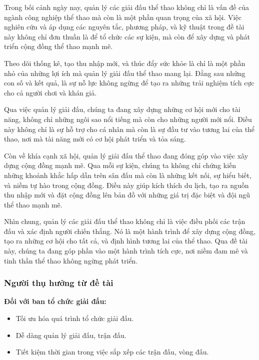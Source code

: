 Trong bối cảnh ngày nay, quản lý các giải đấu thể thao không chỉ là vấn đề của ngành công nghiệp thể thao mà còn là một phần quan trọng của xã hội. Việc nghiên cứu và áp dụng các nguyên tắc, phương pháp, và kỹ thuật trong đề tài này không chỉ đơn thuần là để tổ chức các sự kiện, mà còn để xây dựng và phát triển cộng đồng thể thao mạnh mẽ.
\par
Theo dõi thống kê, tạo thu nhập mới, và thúc đẩy sức khỏe là chỉ là một phần nhỏ của những lợi ích mà quản lý giải đấu thể thao mang lại. Đằng sau những con số và kết quả, là sự nỗ lực không ngừng để tạo ra những trải nghiệm tích cực cho cả người chơi và khán giả.
\par
Qua việc quản lý giải đấu, chúng ta đang xây dựng những cơ hội mới cho tài năng, không chỉ những ngôi sao nổi tiếng mà còn cho những người mới nổi. Điều này không chỉ là sự hỗ trợ cho cá nhân mà còn là sự đầu tư vào tương lai của thể thao, nơi mà tài năng mới có cơ hội phát triển và tỏa sáng.
\par
Còn về khía cạnh xã hội, quản lý giải đấu thể thao đang đóng góp vào việc xây dựng cộng đồng mạnh mẽ. Qua mỗi sự kiện, chúng ta không chỉ chứng kiến những khoảnh khắc hấp dẫn trên sân đấu mà còn là những kết nối, sự hiểu biết, và niềm tự hào trong cộng đồng. Điều này giúp kích thích du lịch, tạo ra nguồn thu nhập mới và đặt cộng đồng lên bản đồ với những giá trị đặc biệt và đội ngũ thể thao mạnh mẽ.
\par
Nhìn chung, quản lý các giải đấu thể thao không chỉ là việc điều phối các trận đấu và xác định người chiến thắng. Nó là một hành trình để xây dựng cộng đồng, tạo ra những cơ hội cho tất cả, và định hình tương lai của thể thao. Qua đề tài này, chúng ta đang góp phần vào một hành trình tích cực, nơi niềm đam mê và tinh thần thể thao không ngừng phát triển.


\subsubsection{Người thụ hưởng từ đề tài}

\noindent
\textbf{Đối với ban tổ chức giải đấu:}
\vspace{-0.5em}
\begin{itemize}[leftmargin=1.5cm, label={--}]
  \item Tối ưu hóa quá trình tổ chức giải đấu.
  \item Dễ dàng quản lý giải đấu, trận đấu.
  \item Tiết kiệm thời gian trong việc sắp xếp các trận đấu, vòng đấu.

\end{itemize}

